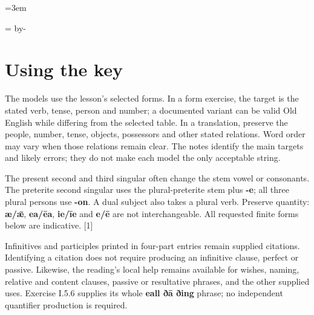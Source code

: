\newcommand{\runningtitle}{Unit 5. Answer key}

\emergencystretch=3em
\newcommand{\itempara}[2]{\par\addvspace{3pt}\noindent\hangindent=1.8em\hangafter=1\makebox[1.8em][l]{#1.}#2\par}
\newcommand{\reserve}[1]{\par\penalty-100\begingroup\dimen0=\pagegoal\advance\dimen0 by-\pagetotal\ifdim\dimen0<#1\newpage\fi\endgroup}

\raggedright
{}

\reserve{7\baselineskip}
\section*{Using the key}

The models use the lesson's selected forms. In a form exercise, the target is the stated verb, tense, person and number; a documented variant can be valid Old English while differing from the selected table. In a translation, preserve the people, number, tense, objects, possessors and other stated relations. Word order may vary when those relations remain clear. The notes identify the main targets and likely errors; they do not make each model the only acceptable string.

The present second and third singular often change the stem vowel or consonants. The preterite second singular uses the plural-preterite stem plus \textbf{-e}; all three plural persons use \textbf{-on}. A dual subject also takes a plural verb. Preserve quantity: \textbf{æ/\allowbreak{}ǣ}, \textbf{ea/\allowbreak{}ēa}, \textbf{ie/\allowbreak{}īe} and \textbf{e/\allowbreak{}ē} are not interchangeable. All requested finite forms below are indicative. [1]

Infinitives and participles printed in four-part entries remain supplied citations. Identifying a citation does not require producing an infinitive clause, perfect or passive. Likewise, the reading's local help remains available for wishes, naming, relative and content clauses, passive or resultative phrases, and the other supplied uses. Exercise I.5.6 supplies its whole \textbf{eall ðā ðing} phrase; no independent quantifier production is required.

